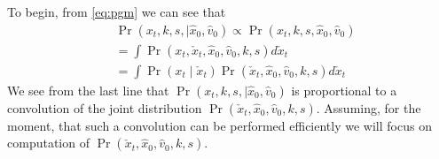 \documentclass[conference]{IEEEtran}
\begin{document}
To begin, from \eqref{eq:pgm} we can see that
\begin{align}
	&\Pr( x_t, k,s,\mid \hat{x}_0, \hat{v}_0) \propto \Pr( x_t, k,s,\hat{x}_0, \hat{v}_0) \\
	&= \int \Pr( x_t, \check{x}_t , \hat{x}_0, \hat{v}_0, k,s) d\check{x}_t \\
	&= \int \Pr( x_t \mid \check{x}_t ) \Pr(\check{x}_t , \hat{x}_0, \hat{v}_0, k,s) d\check{x}_t \label{eq:convolve}
\end{align}
We see from the last line that $\Pr( x_t, k,s,\mid \hat{x}_0, \hat{v}_0)$ is proportional to a convolution of the joint distribution $\Pr( \check{x}_t , \hat{x}_0, \hat{v}_0, k,s)$.
Assuming, for the moment, that such a convolution can be performed efficiently we will focus on computation of $\Pr( \check{x}_t , \hat{x}_0, \hat{v}_0, k,s)$.
\end{document}
